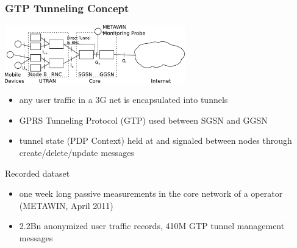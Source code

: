 \documentclass{beamer}
\begin{document}
\begin{frame}
    \frametitle{GTP Tunneling Concept}

      \begin{center}
		\includegraphics[height=2.5cm]{figures/umts-network.pdf}
	\end{center}


    \begin{itemize}
		\item any user traffic in a 3G net is encapsulated into tunnels
		\item GPRS Tunneling Protocol (GTP) used between SGSN and GGSN
		\item tunnel state (PDP Context) held at and signaled between nodes through create/delete/update messages
	\end{itemize}
	Recorded dataset
	\begin{itemize}
		\item one week long passive measurements in the core network of a operator (METAWIN, April 2011)
		\item 2.2Bn anonymized user traffic records, 410M GTP tunnel management messages
	\end{itemize}
\end{frame}
\end{document}
